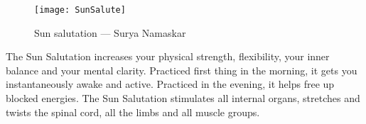 \documentclass[../Book.Stress_regulation.tex]{subfiles}
\begin{document}
\label{Ex:SunSalutation}
\begin{figure}[htb!]
\texttt{[image: SunSalute]}
\caption{Sun salutation --- Surya Namaskar}
\end{figure}


The Sun Salutation increases your physical strength, flexibility, your inner balance and your mental clarity.
Practiced first thing in the morning, it gets you instantaneously awake and active.
Practiced in the evening, it helps free up blocked energies.
The Sun Salutation stimulates all internal organs, stretches and twists the spinal cord, all the limbs and all muscle groups.
\end{document}
